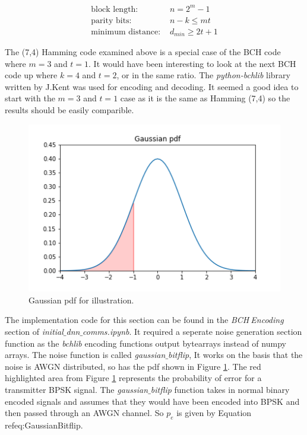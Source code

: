 \documentclass[12pt,onecolumn,letterpaper]{article}
\newcommand{\code}{\textit}
\newcommand\genfigsize{0.5}
\begin{document}
\begin{align}
   \mbox{block length: }& n = 2^{m}-1 \nonumber\\
   \mbox{parity bits: }& n-k\leq mt \nonumber\\
   \mbox{minimum distance: }& d_{min} \geq 2t+1
   \label{eq:BchCharacteristics}
\end{align}

The (7,4) Hamming code examined above is a special case of the BCH code where $m=3$ and $t=1$. It would have been interesting to look at the next BCH code up where $k=4$ and $t=2$, or in the same ratio. The \code{python-bchlib} library~\cite{BchGithub} written by J.Kent was used for encoding and decoding. It seemed a good idea to start with the $m=3$ and $t=1$ case as it is the same as Hamming (7,4) so the results should be easily comparible.

\begin{figure}
   \centering
   \includegraphics[width=\genfigsize\linewidth]{figures/gaussian_pdf.png}
   \caption{Gaussian pdf for illustration.}
   \label{fig:GaussianPdf}
\end{figure}

The implementation code for this section can be found in the \textit{BCH$\ $Encoding} section of \code{initial$\_$dnn$\_$comms.ipynb}. It required a seperate noise generation section function as the \code{bchlib} encoding functions output bytearrays instead of numpy arrays.  The noise function is called \code{gaussian$\_$bitflip}, It works on the basis that the noise is AWGN distributed, so has the pdf shown in Figure \ref{fig:GaussianPdf}. The red highlighted area from Figure \ref{fig:GaussianPdf} represents the probability of error for a transmitter BPSK signal. The \code{gaussian$\_$bitflip} function takes in normal binary encoded signals and assumes that they would have been encoded into BPSK and then passed through an AWGN channel. So $p_e$ is given by Equation ref{eq:GaussianBitflip}.
\end{document}
